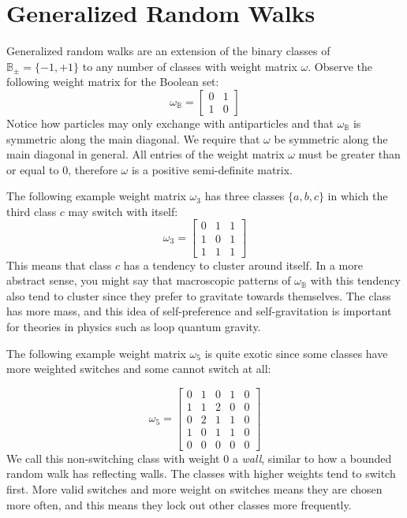 \documentclass[10pt, a5paper, twoside, openright]{memoir}
\begin{document}
\section{Generalized Random Walks}
Generalized random walks are an extension of the binary classes of $\mathbb B_\pm = \{-1,+1\}$ to any number of classes with weight matrix $\omega$. Observe the following weight matrix for the Boolean set:
$$\omega_{\mathbb B} = 
\begin{bmatrix}
0 & 1 \\
1 & 0
\end{bmatrix}
$$
\noindent
Notice how particles may only exchange with antiparticles and that $\omega_{\mathbb B}$ is symmetric along the main diagonal. We require that $\omega$ be symmetric along the main diagonal in general. All entries of the weight matrix $\omega$ must be greater than or equal to $0$, therefore $\omega$ is a positive semi-definite matrix.

The following example weight matrix $\omega_3$ has three classes $\{a,b,c\}$ in which the third class $c$ may switch with itself:
$$\omega_{3} = 
\begin{bmatrix}
0 & 1 & 1 \\
1 & 0 & 1 \\
1 & 1 & 1
\end{bmatrix}
$$
This means that class $c$ has a tendency to cluster around itself. In a more abstract sense, you might say that macroscopic patterns of $\omega_{\mathbb B}$ with this tendency also tend to cluster since they prefer to gravitate towards themselves. The class has more mass, and this idea of self-preference and self-gravitation is important for theories in physics such as loop quantum gravity.

The following example weight matrix $\omega_5$ is quite exotic since some classes have more weighted switches and some cannot switch at all:

$$\omega_{5} = 
\begin{bmatrix}
0 & 1 & 0 & 1 & 0 \\
1 & 1 & 2 & 0 & 0 \\
0 & 2 & 1 & 1 & 0 \\
1 & 0 & 1 & 1 & 0 \\
0 & 0 & 0 & 0 & 0
\end{bmatrix}
$$
We call this non-switching class with weight $0$ a \textit{wall}, similar to how a bounded random walk has reflecting walls. The classes with higher weights tend to switch first. More valid switches and more weight on switches means they are chosen more often, and this means they lock out other classes more frequently.
\end{document}
